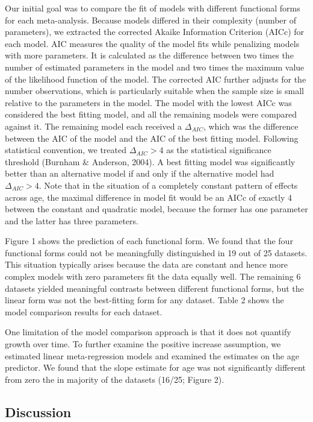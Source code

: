 \documentclass[
  man]{apa6}
\begin{document}
Our initial goal was to compare the fit of models with different functional forms for each meta-analysis. Because models differed in their complexity (number of parameters), we extracted the corrected Akaike Information Criterion (AICc) for each model. AIC measures the quality of the model fits while penalizing models with more parameters. It is calculated as the difference between two times the number of estimated parameters in the model and two times the maximum value of the likelihood function of the model. The corrected AIC further adjusts for the number observations, which is particularly suitable when the sample size is small relative to the parameters in the model. The model with the lowest AICc was considered the best fitting model, and all the remaining models were compared against it. The remaining model each received a \(\Delta_{AIC}\), which was the difference between the AIC of the model and the AIC of the best fitting model. Following statistical convention, we treated \(\Delta_{AIC} > 4\) as the statistical significance threshold (Burnham \& Anderson, 2004). A best fitting model was significantly better than an alternative model if and only if the alternative model had \(\Delta_{AIC} > 4\). Note that in the situation of a completely constant pattern of effects across age, the maximal difference in model fit would be an AICc of exactly 4 between the constant and quadratic model, because the former has one parameter and the latter has three parameters.

Figure 1 shows the prediction of each functional form. We found that the four functional forms could not be meaningfully distinguished in 19 out of 25 datasets. This situation typically arises because the data are constant and hence more complex models with zero parameters fit the data equally well. The remaining 6 datasets yielded meaningful contrasts between different functional forms, but the linear form was not the best-fitting form for any dataset. Table 2 shows the model comparison results for each dataset.

One limitation of the model comparison approach is that it does not quantify growth over time. To further examine the positive increase assumption, we estimated linear meta-regression models and examined the estimates on the age predictor. We found that the slope estimate for age was not significantly different from zero the in majority of the datasets (16/25; Figure 2).

\hypertarget{discussion}{%
\subsection{Discussion}\label{discussion}}
\end{document}
